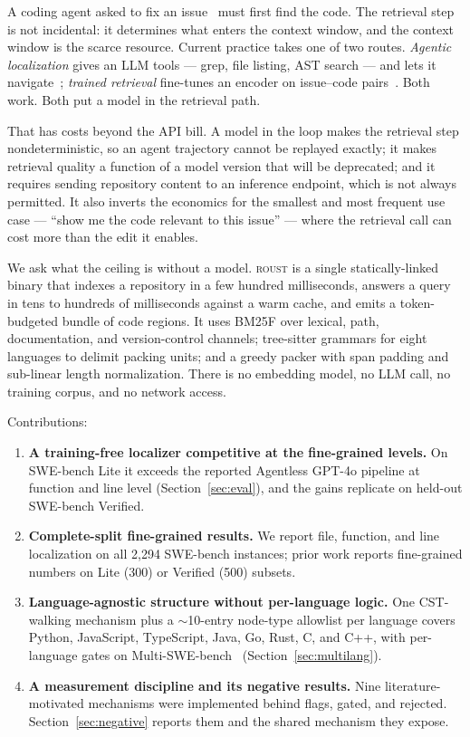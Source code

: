 \documentclass[11pt]{article}
\begin{document}
A coding agent asked to fix an issue~\cite{swebench} must first find the code. The retrieval
step is not incidental: it determines what enters the context window, and the
context window is the scarce resource. Current practice takes one of two
routes. \emph{Agentic localization} gives an LLM tools --- grep, file listing,
AST search --- and lets it navigate~\cite{agentless,locagent,cosil,orcaloca};
\emph{trained retrieval} fine-tunes an encoder on issue--code
pairs~\cite{swerank}. Both work. Both put a model in the retrieval path.

That has costs beyond the API bill. A model in the loop makes the retrieval
step nondeterministic, so an agent trajectory cannot be replayed exactly; it
makes retrieval quality a function of a model version that will be deprecated;
and it requires sending repository content to an inference endpoint, which is
not always permitted. It also inverts the economics for the smallest and most
frequent use case --- ``show me the code relevant to this issue'' --- where
the retrieval call can cost more than the edit it enables.

We ask what the ceiling is without a model. \textsc{roust} is a single
statically-linked binary that indexes a repository in a few hundred
milliseconds, answers a query in tens to hundreds of milliseconds against a
warm cache, and emits a token-budgeted bundle of code regions. It uses BM25F
over lexical, path, documentation, and version-control channels; tree-sitter
grammars for eight languages to delimit packing units; and a greedy packer
with span padding and sub-linear length normalization. There is no embedding
model, no LLM call, no training corpus, and no network access.

Contributions:

\begin{enumerate}
  \item \textbf{A training-free localizer competitive at the fine-grained
  levels.} On SWE-bench Lite it exceeds the reported Agentless GPT-4o pipeline
  at function and line level (Section~\ref{sec:eval}), and the gains replicate
  on held-out SWE-bench Verified.
  \item \textbf{Complete-split fine-grained results.} We report file,
  function, and line localization on all 2{,}294 SWE-bench instances; prior
  work reports fine-grained numbers on Lite (300) or Verified (500) subsets.
  \item \textbf{Language-agnostic structure without per-language logic.} One
  CST-walking mechanism plus a $\sim$10-entry node-type allowlist per language
  covers Python, JavaScript, TypeScript, Java, Go, Rust, C, and C++, with
  per-language gates on Multi-SWE-bench~\cite{multiswebench}
  (Section~\ref{sec:multilang}).
  \item \textbf{A measurement discipline and its negative results.} Nine
  literature-motivated mechanisms were implemented behind flags, gated, and
  rejected. Section~\ref{sec:negative} reports them and the shared mechanism
  they expose.
\end{enumerate}
\end{document}
